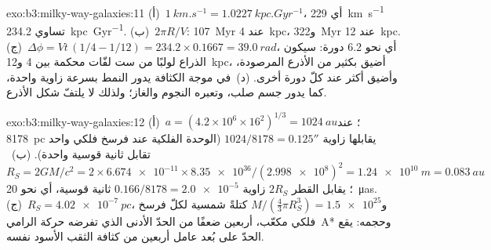 \begin{solution}{exo:b3:milky-way-galaxies:11}
(أ)~$\qty{1}{km.s^{-1}} = \qty{1.0227}{kpc.Gyr^{-1}}$، أي
\qty{229}{km.s^{-1}} تساوي \qty{234.2}{kpc.Gyr^{-1}}. (ب)~$2\pi R/V$:
\qty{107}{Myr} عند \qty{4}{kpc}، و\qty{322}{Myr} عند \qty{12}{kpc}.
(ج)~$\Delta\phi = Vt\,(1/4 - 1/12) = 234.2\times0.1667 = \qty{39.0}{rad}$،
أي نحو 6.2 دورة: سيكون الذراع لولبًا من ست لفّات محكمة بين 4
و\qty{12}{kpc}، أضيق بكثير من الأذرع المرصودة، وأضيق أكثر عند كلّ
دورة أخرى. (د)~في موجة الكثافة يدور النمط بسرعة زاوية واحدة، كما يدور جسم صلب،
وتعبره النجوم والغاز؛ ولذلك لا يلتفّ شكل
الأذرع.
\end{solution}

\begin{solution}{exo:b3:milky-way-galaxies:12}
(أ)~$a = (4.2\times10^6\times16^2)^{1/3} = \qty{1024}{au}$؛ عند
\qty{8178}{pc} يقابلها زاوية $1024/8178 = \ang{;;0.125}$ (الوحدة الفلكية عند فرسخ فلكي واحد
تقابل ثانية قوسية واحدة). (ب)~$R_S = 2GM/c^2 = 2\times\num{6.674e-11}
\times\num{8.35e36}/(\num{2.998e8})^2 = \qty{1.24e10}{m} = \qty{0.083}{au}$؛
يقابل القطر $2R_S$ زاوية $0.166/8178 = \num{2.0e-5}$ ثانية قوسية، أي نحو
\qty{20}{\micro as}. (ج)~$R_S = \qty{4.02e-7}{pc}$، و$M/(\tfrac43\pi
R_S^3) = \num{1.5e25}$ كتلةً شمسية لكلّ فرسخ فلكي مكعّب، أربعين ضعفًا
من الحدّ الأدنى الذي تفرضه حركة الرامي~A* وحجمه: يقع الحدّ على بُعد
عامل أربعين من كثافة الثقب الأسود نفسه.
\end{solution}

